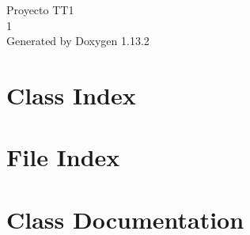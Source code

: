 \documentclass[twoside]{book}
\newcommand{\+}{\discretionary{\mbox{\scriptsize$\hookleftarrow$}}{}{}}
\newcommand{\clearemptydoublepage}{%
    \newpage{\pagestyle{empty}\cleardoublepage}%
  }
\begin{document}
  \raggedbottom
    \hypersetup{pageanchor=false,
                bookmarksnumbered=true,
                pdfencoding=unicode
               }
  \begin{titlepage}
  \vspace*{7cm}
  \begin{center}%
  {\Large Proyecto TT1}\\
  [1ex]\large 1 \\
  \vspace*{1cm}
  {\large Generated by Doxygen 1.13.2}\\
  \end{center}
  \end{titlepage}
  \clearemptydoublepage
  \tableofcontents
  \clearemptydoublepage
  \hypersetup{pageanchor=true}

\chapter{Class Index}

\chapter{File Index}

\chapter{Class Documentation}



\end{document}
